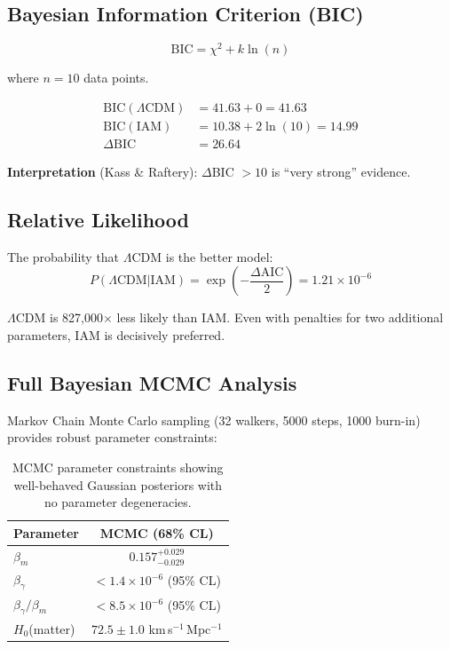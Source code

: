 \documentclass[twocolumn,superscriptaddress,prl,amsmath,amssymb]{revtex4-2}
\begin{document}
\subsection{Bayesian Information Criterion (BIC)}

\begin{equation}
\text{BIC} = \chi^2 + k \ln(n)
\end{equation}

where $n = 10$ data points.

\begin{align}
\text{BIC}(\Lambda\text{CDM}) &= 41.63 + 0 = 41.63 \nonumber\\
\text{BIC}(\text{IAM}) &= 10.38 + 2\ln(10) = 14.99 \nonumber\\
\Delta\text{BIC} &= 26.64
\end{align}

\textbf{Interpretation} (Kass \& Raftery): $\Delta$BIC $> 10$ is ``very strong'' evidence.

\subsection{Relative Likelihood}

The probability that $\Lambda$CDM is the better model:
\begin{equation}
P(\Lambda\text{CDM} | \text{IAM}) = \exp\left(-\frac{\Delta\text{AIC}}{2}\right) = 1.21 \times 10^{-6}
\end{equation}

$\Lambda$CDM is 827,000$\times$ less likely than IAM. Even with penalties for two additional parameters, IAM is decisively preferred.

\subsection{Full Bayesian MCMC Analysis}

Markov Chain Monte Carlo sampling (32 walkers, 5000 steps, 1000 burn-in) provides robust parameter constraints:

\begin{table}[h]
\centering
\begin{tabular}{lc}
\hline\hline
Parameter & MCMC (68\% CL) \\
\hline
$\beta_m$ & $0.157^{+0.029}_{-0.029}$ \\
$\beta_\gamma$ & $< 1.4 \times 10^{-6}$ (95\% CL) \\
$\beta_\gamma/\beta_m$ & $< 8.5 \times 10^{-6}$ (95\% CL) \\
$H_0$(matter) & $72.5 \pm 1.0$ km\,s$^{-1}$\,Mpc$^{-1}$ \\
\hline\hline
\end{tabular}
\caption{MCMC parameter constraints showing well-behaved Gaussian posteriors with no parameter degeneracies.}
\end{table}
\end{document}
